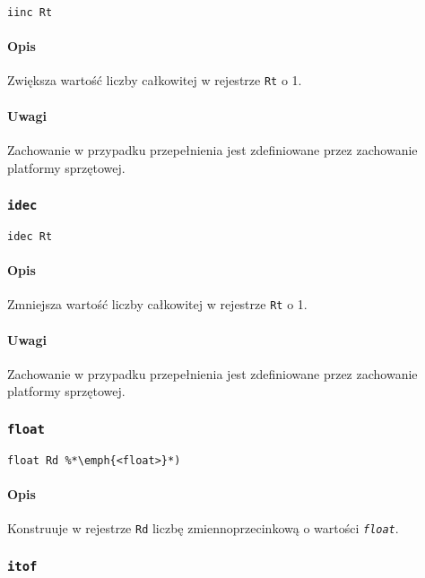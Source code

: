 \begin{lstlisting}
iinc Rt
\end{lstlisting}

\paragraph*{Opis} Zwiększa wartość liczby całkowitej w rejestrze \texttt{Rt} o 1.
\paragraph*{Uwagi} Zachowanie w przypadku przepełnienia jest zdefiniowane przez
zachowanie platformy sprzętowej.

\subsubsection{\texttt{idec}}

\begin{lstlisting}
idec Rt
\end{lstlisting}

\paragraph*{Opis} Zmniejsza wartość liczby całkowitej w rejestrze \texttt{Rt} o 1.
\paragraph*{Uwagi} Zachowanie w przypadku przepełnienia jest zdefiniowane przez
zachowanie platformy sprzętowej.

\subsubsection{\texttt{float}}

\begin{lstlisting}
float Rd %*\emph{<float>}*)
\end{lstlisting}

\paragraph*{Opis} Konstruuje w rejestrze \texttt{Rd} liczbę zmiennoprzecinkową o wartości
\emph{\texttt{float}}.

\subsubsection{\texttt{itof}}

